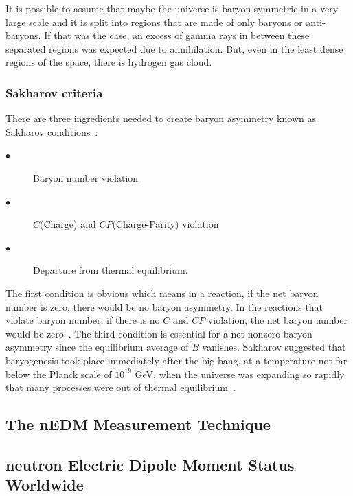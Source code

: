 It is possible to assume that maybe the universe is baryon symmetric
in a very large scale and it is split into regions that are made of
only baryons or anti-baryons. If that was the case, an excess of gamma
rays in between these separated regions was expected due to
annihilation. But, even in the least dense regions of the space,
there is hydrogen gas cloud.  \\

\subsubsection{Sakharov criteria}
There are three ingredients needed to
create baryon asymmetry known as Sakharov conditions~\cite{Sakharov:1967dj}:
\begin{center}
\begin{description}
\item[$\bullet$]Baryon number violation
\item[$\bullet$] $C$(Charge) and $CP$(Charge-Parity) violation
\item[$\bullet$] Departure from thermal equilibrium.
\end{description}
\end{center}

The first condition is obvious which means in a reaction, if the net
baryon number is zero, there would be no baryon asymmetry. In the
reactions that violate baryon number, if there is no $C$ and $CP$
violation, the net baryon number would be zero~\cite{theearlyuniverse}.
The third condition is essential for a net nonzero baryon asymmetry
since the equilibrium average of $B$ vanishes. Sakharov suggested that
baryogenesis took place immediately after the big bang, at a
temperature not far below the Planck scale of $10^{19}$ GeV, when the
universe was expanding so rapidly that many processes were out of
thermal equilibrium~\cite{cohen1993progress}.



\subsection{The nEDM Measurement Technique}

\subsection{neutron Electric Dipole Moment Status Worldwide}

